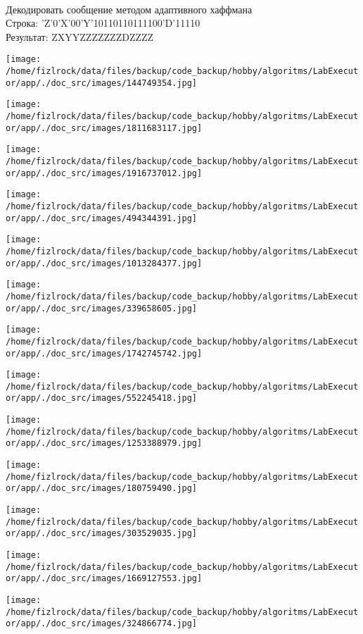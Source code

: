 \documentclass[a4paper, 12pt]{article}
\begin{document}
\\ 

Декодировать сообщение методом адаптивного хаффмана \\
Строка: 
'Z'0'X'00'Y'10110110111100'D'11110\\
Результат: ZXYYZZZZZZZDZZZZ

\texttt{[image: /home/fizlrock/data/files/backup/code\_backup/hobby/algoritms/LabExecutor/app/./doc\_src/images/144749354.jpg]}

\texttt{[image: /home/fizlrock/data/files/backup/code\_backup/hobby/algoritms/LabExecutor/app/./doc\_src/images/1811683117.jpg]}

\texttt{[image: /home/fizlrock/data/files/backup/code\_backup/hobby/algoritms/LabExecutor/app/./doc\_src/images/1916737012.jpg]}

\texttt{[image: /home/fizlrock/data/files/backup/code\_backup/hobby/algoritms/LabExecutor/app/./doc\_src/images/494344391.jpg]}

\texttt{[image: /home/fizlrock/data/files/backup/code\_backup/hobby/algoritms/LabExecutor/app/./doc\_src/images/1013284377.jpg]}

\texttt{[image: /home/fizlrock/data/files/backup/code\_backup/hobby/algoritms/LabExecutor/app/./doc\_src/images/339658605.jpg]}

\texttt{[image: /home/fizlrock/data/files/backup/code\_backup/hobby/algoritms/LabExecutor/app/./doc\_src/images/1742745742.jpg]}

\texttt{[image: /home/fizlrock/data/files/backup/code\_backup/hobby/algoritms/LabExecutor/app/./doc\_src/images/552245418.jpg]}

\texttt{[image: /home/fizlrock/data/files/backup/code\_backup/hobby/algoritms/LabExecutor/app/./doc\_src/images/1253388979.jpg]}

\texttt{[image: /home/fizlrock/data/files/backup/code\_backup/hobby/algoritms/LabExecutor/app/./doc\_src/images/180759490.jpg]}

\texttt{[image: /home/fizlrock/data/files/backup/code\_backup/hobby/algoritms/LabExecutor/app/./doc\_src/images/303529035.jpg]}

\texttt{[image: /home/fizlrock/data/files/backup/code\_backup/hobby/algoritms/LabExecutor/app/./doc\_src/images/1669127553.jpg]}

\texttt{[image: /home/fizlrock/data/files/backup/code\_backup/hobby/algoritms/LabExecutor/app/./doc\_src/images/324866774.jpg]}
\end{document}
